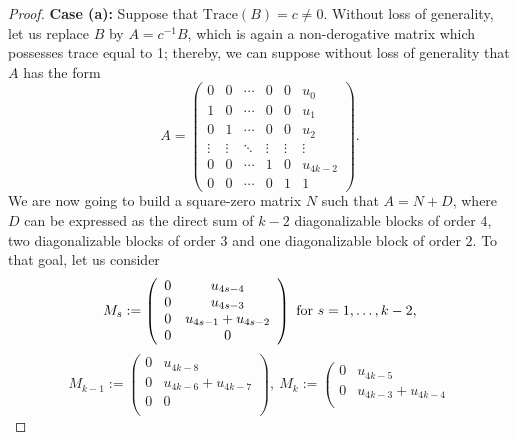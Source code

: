 \documentclass{amsart}
\theoremstyle{definition}
\theoremstyle{remark}
\numberwithin{equation}{section}
\begin{document}
\begin{proof}
{\bf Case (a):} Suppose that $\text{Trace}(B)=c\ne 0$. Without loss of generality, let us replace $B$ by $A=c^{-1}B$, which is again a non-derogative matrix which possesses trace equal to 1; thereby, we can suppose without loss of generality that $A$ has the form
$$
A=\left(\begin{array}{cccccc}
                                                                          0 & 0 & \cdots & 0 & 0 &u_0\\
                                                                          1 & 0 & \cdots & 0 & 0 &u_1\\
                                                                          0 & 1 & \cdots & 0 & 0 &u_2\\
                                                                          \vdots & \vdots & \ddots & \vdots & \vdots &\vdots\\
                                                                          0 & 0 & \cdots & 1 & 0 &u_{4k-2}\\
                                                                          0 & 0 & \cdots & 0 & 1 &1
                                                                        \end{array}\right).$$
We are now going to build a square-zero matrix $N$ such that $A=N+D$, where $D$ can be expressed as the direct sum of $k-2$ diagonalizable blocks of order $4$, two diagonalizable blocks of order $3$ and one diagonalizable block of order $2$. To that goal, let us consider
$$
M_s:=\left(
   \begin{array}{cc}
      0 &u_{4s-4}\\
      0 &u_{4s-3}\\
      0 &u_{4s-1}+u_{4s-2}\\
      0 &0\\
   \end{array}
 \right) \hbox{ for  $s=1,\dots, k-2$,}
$$
\small
 $$M_{k-1}:=\left(
   \begin{array}{cc}
      0 &u_{4k-8}\\
      0 &u_{4k-6}+u_{4k-7}\\
      0 &0\\
   \end{array}
 \right),\  M_{k}:=\left(
   \begin{array}{cc}
      0 &u_{4k-5}\\
      0 &u_{4k-3}+u_{4k-4}\\

\end{array}$$
\end{proof}
\end{document}
